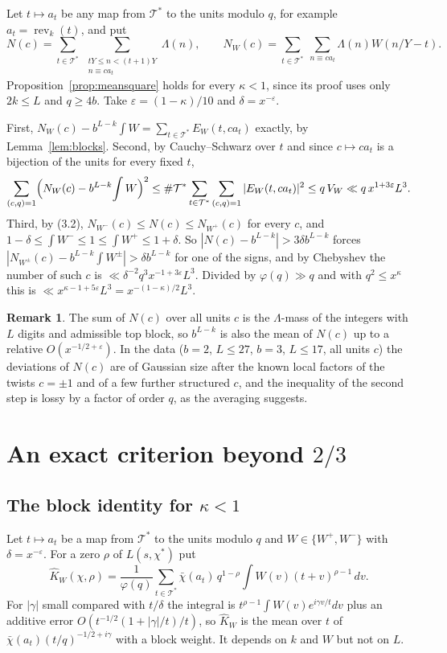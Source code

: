 \documentclass[11pt]{amsart}
\makeatletter
\theoremstyle{definition}
\newtheorem{remark}[theorem]{Remark}
\numberwithin{equation}{section}
\renewenvironment{proof}[1][\proofname]{\par\pushQED{\qed}\normalfont\topsep6\p@\@plus6\p@\relax\trivlist\item[\hskip\labelsep\upshape#1.]\ignorespaces}{\popQED\endtrivlist\@endpefalse}
\newcommand{\rev}{\operatorname{rev}}
\newcommand{\cT}{\mathcal{T}}
\makeatother
\begin{document}
\begin{proof}[Proof of Theorem~\ref{thm:twists}]
Let $t\mapsto a_t$ be any map from $\cT^*$ to the units modulo $q$, for example $a_t=\rev_k(t)$, and put
\[
N(c)=\sum_{t\in\cT^*}\ \sum_{\substack{tY\le n<(t+1)Y\\ n\equiv ca_t}}\Lambda(n),\qquad N_W(c)=\sum_{t\in\cT^*}\ \sum_{n\equiv ca_t}\Lambda(n)W(n/Y-t).
\] Proposition~\ref{prop:meansquare} holds for every $\kappa<1$, since its proof uses only $2k\le L$ and $q\ge4b$. Take $\varepsilon=(1-\kappa)/10$ and $\delta=x^{-\varepsilon}$.

First, $N_W(c)-b^{L-k}\int W=\sum_{t\in\cT^*}E_W(t,ca_t)$ exactly, by Lemma~\ref{lem:blocks}. Second, by Cauchy--Schwarz over $t$ and since $c\mapsto ca_t$ is a bijection of the units for every fixed $t$,
\[
\sum_{(c,q)=1}\Bigl(N_W(c)-b^{L-k}\!\int W\Bigr)^2\le\#\cT^*\sum_{t\in\cT^*}\sum_{(c,q)=1}|E_W(t,ca_t)|^2\le q\,V_W\ll q\,x^{1+3\varepsilon}L^3.
\]
Third, by (3.2), $N_{W^-}(c)\le N(c)\le N_{W^+}(c)$ for every $c$, and $1-\delta\le\int W^-\le1\le\int W^+\le1+\delta$. So $|N(c)-b^{L-k}|>3\delta b^{L-k}$ forces $|N_{W^\pm}(c)-b^{L-k}\int W^\pm|>\delta b^{L-k}$ for one of the signs, and by Chebyshev the number of such $c$ is $\ll\delta^{-2}q^3x^{-1+3\varepsilon}L^3$. Divided by $\varphi(q)\gg q$ and with $q^2\le x^\kappa$ this is $\ll x^{\kappa-1+5\varepsilon}L^3=x^{-(1-\kappa)/2}L^3$.
\end{proof}

\begin{remark}
The sum of $N(c)$ over all units $c$ is the $\Lambda$-mass of the integers with $L$ digits and admissible top block, so $b^{L-k}$ is also the mean of $N(c)$ up to a relative $O(x^{-1/2+\varepsilon})$. In the data ($b=2$, $L\le27$, $b=3$, $L\le17$, all units $c$) the deviations of $N(c)$ are of Gaussian size after the known local factors of the twists $c=\pm1$ and of a few further structured $c$, and the inequality of the second step is lossy by a factor of order $q$, as the averaging suggests.
\end{remark}

\section{\texorpdfstring{An exact criterion beyond $2/3$}{An exact criterion beyond 2/3}}\label{sec:criterion}

\subsection{\texorpdfstring{The block identity for $\kappa<1$}{The block identity for kappa < 1}}
Let $t\mapsto a_t$ be a map from $\cT^*$ to the units modulo $q$ and $W\in\{W^+,W^-\}$ with $\delta=x^{-\varepsilon}$. For a zero $\rho$ of $L(s,\chi^*)$ put
\[
\hat K_W(\chi,\rho)=\frac1{\varphi(q)}\sum_{t\in\cT^*}\bar\chi(a_t)\,q^{1-\rho}\int W(v)(t+v)^{\rho-1}\,dv.
\]
For $|\gamma|$ small compared with $t/\delta$ the integral is $t^{\rho-1}\int W(v)e^{i\gamma v/t}dv$ plus an additive error $O(t^{-1/2}(1+|\gamma|/t)/t)$, so $\hat K_W$ is the mean over $t$ of $\bar\chi(a_t)(t/q)^{-1/2+i\gamma}$ with a block weight. It depends on $k$ and $W$ but not on $L$.
\end{document}
